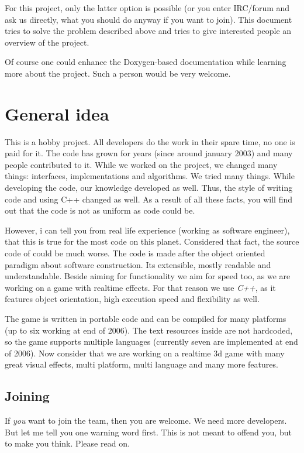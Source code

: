 \documentclass{report}
\begin{document}
For this project, only the latter option is possible (or you enter
IRC/forum and ask us directly, what you should do anyway if you want to
join). This document tries to solve the problem described above and
tries to give interested people an overview of the project.

Of course one could enhance the Doxygen-based documentation while
learning more about the project. Such a person would be very welcome.

\section{General idea}

This is a hobby project. All developers do the work in their spare time,
no one is paid for it. The code has grown for years (since around
january 2003) and many people contributed to it. While we worked on the
project, we changed many things: interfaces, implementations and
algorithms. We tried many things. While developing the code, our
knowledge developed as well. Thus, the style of writing code and using
C++ changed as well. As a result of all these facts, you will find out
that the code is not as uniform as code could be.

However, i can tell you from real life experience (working as software
engineer), that this is true for the most code on this planet.
Considered that fact, the source code of \dftd could be much worse. The
code is made after the object oriented paradigm about software
construction. Its extensible, mostly readable and understandable. Beside
aiming for functionality we aim for speed too, as we are working on a
game with realtime effects.  For that reason we use \emph{C++}, as it
features object orientation, high execution speed and flexibility as
well.

The game is written in portable code and can be compiled for many
platforms (up to six working at end of 2006). The text resources inside
are not hardcoded, so the game supports multiple languages (currently
seven are implemented at end of 2006). Now consider that we are working
on a realtime 3d game with many great visual effects, multi platform,
multi language and many more features.

\subsection{Joining}

If \emph{you} want to join the team, then you are welcome. We need more
developers. But let me tell you one warning word first. This is not
meant to offend you, but to make you think. Please read on.
\end{document}

